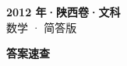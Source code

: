 \documentclass[zihao=-4, a4paper]{ctexart}
\begin{document}
\begin{center}
  {\Large\bfseries 2012 年·陕西卷·文科}\\[4pt]
  {\large 数学 · 简答版}
\end{center}
\medskip
{}

\clearpage
{}
\begin{center}{\Large\bfseries 答案速查}\end{center}
\medskip

\end{document}
